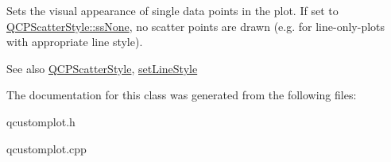Sets the visual appearance of single data points in the plot. If set to \hyperlink{classQCPScatterStyle_adb31525af6b680e6f1b7472e43859349abd144c291ca274f77053ec68cab6c022}{Q\+C\+P\+Scatter\+Style\+::ss\+None}, no scatter points are drawn (e.\+g. for line-\/only-\/plots with appropriate line style).

\begin{DoxySeeAlso}{See also}
\hyperlink{classQCPScatterStyle}{Q\+C\+P\+Scatter\+Style}, \hyperlink{classQCPGraph_a513fecccff5b2a50ce53f665338c60ff}{set\+Line\+Style} 
\end{DoxySeeAlso}


The documentation for this class was generated from the following files\+:\begin{DoxyCompactItemize}
\item 
qcustomplot.\+h\item 
qcustomplot.\+cpp\end{DoxyCompactItemize}
